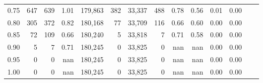 \begin{tabular}{rrrrrrrrrrrrrr}
0.75 &     647 &    639 &    1.01 &  179,863 &      382 &  33,337 &     488 &  0.78 &  0.56 &  0.01 &      0.00 \\
0.80 &     305 &    372 &    0.82 &  180,168 &       77 &  33,709 &     116 &  0.66 &  0.60 &  0.00 &      0.00 \\
0.85 &      72 &    109 &    0.66 &  180,240 &        5 &  33,818 &       7 &  0.71 &  0.58 &  0.00 &      0.00 \\
0.90 &       5 &      7 &    0.71 &  180,245 &        0 &  33,825 &       0 &   nan &   nan &  0.00 &      0.00 \\
0.95 &       0 &      0 &     nan &  180,245 &        0 &  33,825 &       0 &   nan &   nan &  0.00 &      0.00 \\
1.00 &       0 &      0 &     nan &  180,245 &        0 &  33,825 &       0 &   nan &   nan &  0.00 &      0.00 \\
\bottomrule
\end{tabular}
